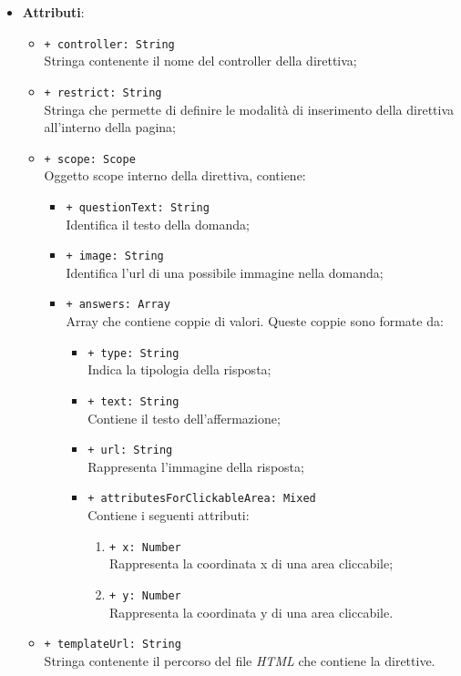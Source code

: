 \begin{itemize}
\begin{itemize}
			\end{itemize}
			\item \textbf{Attributi}: 
				\begin{itemize}
					\item \texttt{+ controller: String} \\ Stringa contenente il nome del controller della direttiva;
					\item \texttt{+ restrict: String} \\ Stringa che permette di definire le modalità di inserimento della direttiva all'interno della pagina;
					\item \texttt{+ scope: Scope} \\ Oggetto scope interno della direttiva, contiene:
					\begin{itemize}	
						\item \texttt{+ questionText: String} \\ Identifica il testo della domanda;
						\item \texttt{+ image: String} \\ Identifica l'url di una possibile immagine nella domanda;
						\item \texttt{+ answers: Array} \\ Array che contiene coppie di valori. Queste coppie sono formate da:
						\begin{itemize}
							\item \texttt{+ type: String} \\ Indica la tipologia della risposta;
							\item \texttt{+ text: String} \\ Contiene il testo dell'affermazione;
							\item \texttt{+ url: String} \\ Rappresenta l'immagine della risposta;
							\item \texttt{+ attributesForClickableArea: Mixed} \\ Contiene i seguenti attributi:
							\begin{enumerate}
								\item \texttt{+ x: Number} \\ Rappresenta la coordinata x di una area cliccabile;
								\item \texttt{+ y: Number} \\ Rappresenta la coordinata y di una area cliccabile.
							\end{enumerate}
						\end{itemize}
					\end{itemize}
					\item \texttt{+ templateUrl: String} \\ Stringa contenente il percorso del file \textit{HTML} che contiene la direttive.
				
				\end{itemize}
		\end{itemize}
	
